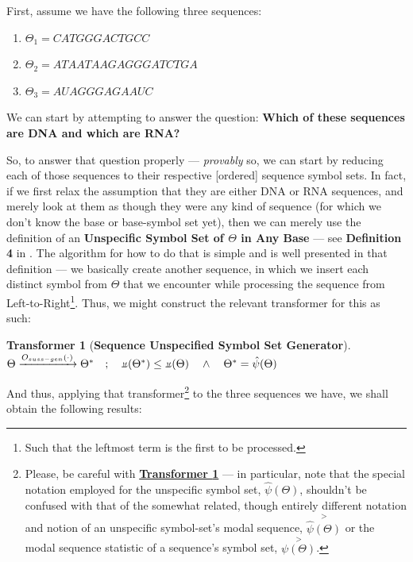 \documentclass[a4paper, 18pt]{book} %
\newtheorem{transf}{Transformer}
\newcommand{\invpi}{\rotatebox[origin=c]{180}{$\pi$}}
\begin{document}
First, assume we have the following three sequences:

\begin{enumerate}
\item $\Theta_1 = CATGGGACTGCC$
\item $\Theta_2 = ATAATAAGAGGGATCTGA$
\item $\Theta_3 = AUAGGGAGAAUC$
\end{enumerate}

We can start by attempting to answer the question: \textbf{Which of these sequences are DNA and which are RNA?}

So, to answer that question properly --- \textit{provably} so, we can start by reducing each of those sequences to their respective [ordered] sequence symbol sets. In fact, if we first relax the assumption that they are either DNA or RNA sequences, and merely look at them as though they were any kind of sequence (for which we don't know the base or base-symbol set yet), then we can merely use the definition of an \textbf{Unspecific Symbol Set of $\Theta$ in Any Base} --- see \textbf{Definition 4} in \cite{ossipaper}. The algorithm for how to do that is simple and is well presented in that definition --- we basically create another sequence, in which we insert each distinct symbol from $\Theta$ that we encounter while processing the sequence from Left-to-Right\footnote{Such that the leftmost term is the first to be processed.}. Thus, we might construct the relevant transformer for this as such:\\

\begin{transf}[\textbf{Sequence Unspecified Symbol Set Generator}]
\label{TRANSSSGEN}$ $\\
$\Theta \xrightarrow{O_{suss-gen}(\cdot)} \Theta^* \quad;\quad \invpi(\Theta^*) \leq \invpi(\Theta) \quad \land \quad \Theta^* = \hat{\psi}(\Theta)$\\
\end{transf}

And thus, applying that transformer\footnote{Please, be careful with \textbf{\hyperref[TRANSSSGEN]{Transformer \ref{TRANSSSGEN}}} --- in particular, note that the special notation employed for the unspecific symbol set, $\hat{\psi}(\Theta)$, shouldn't be confused with that of the somewhat related, though entirely different notation and notion of an unspecific symbol-set's modal sequence, $\overset{>}{\hat{\psi}(\Theta)}$ or the modal sequence statistic of a sequence's symbol set,  $\overset{>}{\psi(\Theta)}$.} to the three sequences we have, we shall obtain the following results:\\
\end{document}
